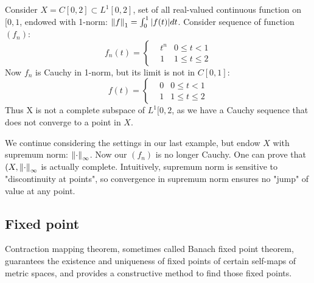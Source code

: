 \begin{example}\rm\nextline
	\placeholder
\end{example}

\begin{example}\rm\nextline
	Consider $X=C[0,2]\subset L^1 [0,2]$, set of all real-valued continuous function on $[0,1$, endowed with 1-norm: $\left\|{f}\right\|_1=\int_0^1|f(t)|dt$. Consider sequence of function $(f_n)$:
	\begin{equation}
		f_n(t)=\left\{
		\begin{aligned}\nonumber
			 & t^n & 0\leq t<1     \\
			 & 1   & 1\leq t\leq 2
		\end{aligned}
		\right.
	\end{equation}
	Now $f_n$ is Cauchy in 1-norm, but its limit is not in $C[0,1]$:
	\begin{equation}
		f(t)=\left\{
		\begin{aligned}\nonumber
			 & 0 & 0\leq t<1     \\
			 & 1 & 1\leq t\leq 2
		\end{aligned}
		\right.
	\end{equation}
	Thus X is not a complete subspace of $L^1[0,2$, as we have a Cauchy sequence that does not converge to a point in $X$.
\end{example}

\begin{example}\rm\nextline
	We continue considering the settings in our last example, but endow $X$ with supremum norm: $\left\|{\cdot}\right\|_\infty$. Now our $(f_n)$ is no longer Cauchy. One can prove that $(X,\left\|{\cdot}\right\|_\infty$ is actually complete. Intuitively, supremum norm is sensitive to "discontinuity at points", so convergence in supremum norm ensures no "jump" of value at any point.
\end{example}
\newpage

\newpage
\subsection{Fixed point}
Contraction mapping theorem, sometimes called Banach fixed point theorem, guarantees the existence and uniqueness of fixed points of certain self-maps of metric spaces, and provides a constructive method to find those fixed points.

